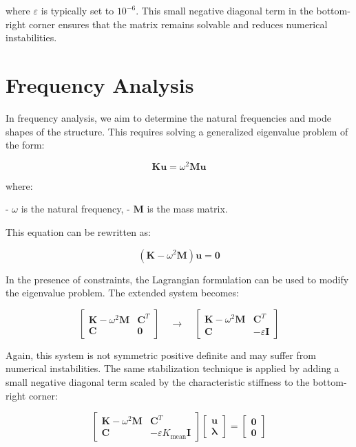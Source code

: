 where \(\varepsilon\) is typically set to \( 10^{-6} \).
This small negative diagonal term in the bottom-right corner ensures that the matrix remains solvable and reduces numerical instabilities.

\section{Frequency Analysis}

In frequency analysis, we aim to determine the natural frequencies and mode shapes of the structure. This requires solving a generalized eigenvalue problem of the form:

\begin{equation}
\mathbf{K} \boldsymbol{u} = \omega^2 \mathbf{M} \boldsymbol{u}
\end{equation}

where:

- \(\omega\) is the natural frequency,
- \(\mathbf{M}\) is the mass matrix.

This equation can be rewritten as:

\begin{equation}
(\mathbf{K} - \omega^2 \mathbf{M}) \boldsymbol{u} = \boldsymbol{0}
\end{equation}

In the presence of constraints, the Lagrangian formulation can be used to modify the eigenvalue problem. The extended system becomes:

\begin{equation}
\begin{bmatrix}
\mathbf{K} - \omega^2 \mathbf{M} & \mathbf{C}^T \\
\mathbf{C} & \mathbf{0}
\end{bmatrix}
\quad \longrightarrow \quad
\begin{bmatrix}
\mathbf{K} - \omega^2 \mathbf{M} & \mathbf{C}^T \\
\mathbf{C} & -\varepsilon \mathbf{I}
\end{bmatrix}
\end{equation}

Again, this system is not symmetric positive definite and may suffer from numerical instabilities. The same stabilization technique is applied by adding a small negative diagonal term scaled by the characteristic stiffness to the bottom-right corner:

\begin{equation}
\begin{bmatrix}
\mathbf{K} - \omega^2 \mathbf{M} & \mathbf{C}^T \\
\mathbf{C} & -\varepsilon K_{\text{mean}} \mathbf{I}
\end{bmatrix}
\begin{bmatrix}
\boldsymbol{u} \\
\boldsymbol{\lambda}
\end{bmatrix}
=
\begin{bmatrix}
\boldsymbol{0} \\
\boldsymbol{0}
\end{bmatrix}
\end{equation}


